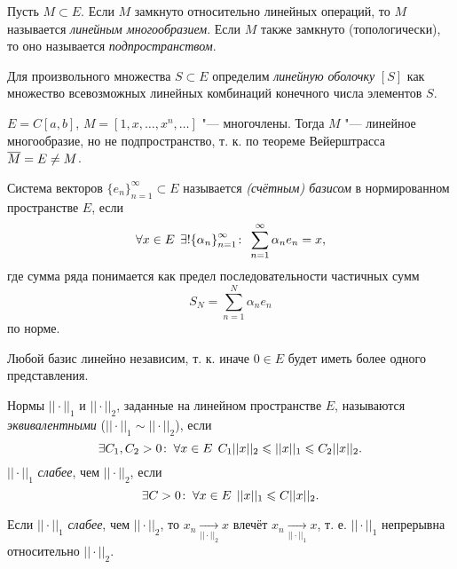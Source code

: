 \documentclass[main]{subfiles}
\begin{document}
\begin{definition}
  Пусть \( M \subset E \). Если \( M \) замкнуто относительно
  линейных операций, то \( M \) называется \emph{линейным многообразием}.
  Если \( M \) также замкнуто (топологически),
  то оно называется \emph{подпространством}.
\end{definition}

\begin{definition}
  Для произвольного множества \( S \subset E \) определим
  \emph{линейную оболочку} \( [S] \)
  как множество всевозможных линейных комбинаций
  конечного числа элементов \( S \).
\end{definition}

\begin{example}
  \( E = C[a, b] \), \( M = [1, x, \dots, x^n, \dots] \) "--- многочлены.
  Тогда \( M \) "--- линейное многообразие, но не подпространство,
  т. к. по теореме Вейерштрасса \( \overline{M}  = E \ne M \).
\end{example}

\begin{definition}
  Система векторов \( {\{ e_n \}}_{n = 1}^\infty \subset E \)
  называется \emph{(счётным) базисом}
  в нормированном пространстве \( E \), если
  \[
    \forall {x \in E} \; \,
    \exists!  {\{ \alpha_n \}}_{n = 1}^\infty  \colon \:
    \sum_{n = 1}^\infty \alpha_n e_n = x,
  \]
  где сумма ряда понимается как
  предел последовательности частичных сумм
  \[ S_N = \sum_{n = 1}^N \alpha_n e_n \]
  по норме.
\end{definition}

\begin{remark}
  Любой базис линейно независим, т. к.
  иначе \( 0 \in E \) будет иметь более одного
  представления.
\end{remark}

\begin{definition}
  Нормы \( ||\cdot||_1 \) и \( ||\cdot||_2 \),
  заданные на линейном пространстве \( E \),
  называются \emph{эквивалентными}
  (\( ||\cdot||_1 \sim ||\cdot||_2 \)),
  если
  \[
    \exists C_1, C_2 > 0 \colon \:
    \forall {x \in E} \; \,
    C_1 ||x||_2 \leqslant ||x||_1 \leqslant C_2 ||x||_2.
  \]
  \( ||\cdot||_1 \) \emph{слабее}, чем \( ||\cdot||_2 \),
  если 
  \[
    \exists C > 0 \colon \:
    \forall {x \in E} \; \,
    ||x||_1 \leqslant C ||x||_2.
  \]
\end{definition}
\begin{remark}
  Если \( ||\cdot||_1 \) \emph{слабее}, чем \( ||\cdot||_2 \),
  то \( x_n \xrightarrow[||\cdot||_2]{} x \)
  влечёт \( x_n \xrightarrow[||\cdot||_1]{} x \),
  т. е. \( ||\cdot||_1 \) непрерывна
  относительно \( ||\cdot||_2 \).
\end{remark}
\end{document}
